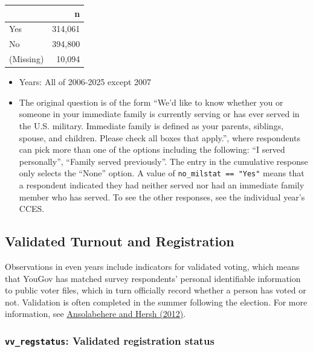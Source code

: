 \documentclass[10pt,article,oneside]{memoir}
\begin{document}
\begin{table}[H]
\centering
\begin{tabular}[t]{lr}
\toprule
 & n\\
\midrule
Yes & 314,061\\
No & 394,800\\
(Missing) & 10,094\\
\bottomrule
\end{tabular}
\end{table}

\begin{itemize}
\tightlist
\item
  Years: All of 2006-2025 except 2007
\item
  The original question is of the form ``We'd like to know whether you
  or someone in your immediate family is currently serving or has ever
  served in the U.S. military. Immediate family is defined as your
  parents, siblings, spouse, and children. Please check all boxes that
  apply.'', where respondents can pick more than one of the options
  including the following: ``I served personally'', ``Family served
  previously''. The entry in the cumulative response only selects the
  ``None'' option. A value of \texttt{no\_milstat\ ==\ "Yes"} means that
  a respondent indicated they had neither served nor had an immediate
  family member who has served. To see the other responses, see the
  individual year's CCES.
\end{itemize}

\subsection{Validated Turnout and
Registration}\label{validated-turnout-and-registration}

Observations in even years include indicators for validated voting,
which means that YouGov has matched survey respondents' personal
identifiable information to public voter files, which in turn officially
record whether a person has voted or not. Validation is often completed
in the summer following the election. For more information, see
\href{https://doi.org/10.1093/pan/mps023}{Ansolabehere and Hersh
(2012)}.

\subsubsection{\texorpdfstring{\texttt{vv\_regstatus}: Validated
registration
status}{vv\_regstatus: Validated registration status}}\label{vv_regstatus-validated-registration-status}
\end{document}
